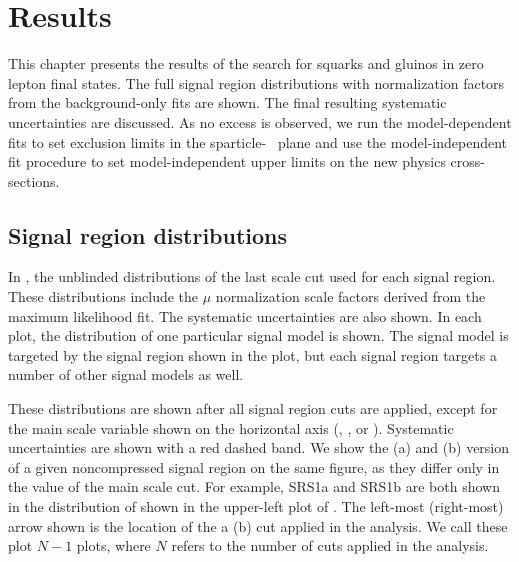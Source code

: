 

\chapter[Results][Results]{Results}

This chapter presents the results of the search for squarks and gluinos in zero lepton final states.
The full signal region distributions with normalization factors from the background-only fits are shown.
The final resulting systematic uncertainties are discussed.
As no excess is observed, we run the model-dependent fits to set exclusion limits in the sparticle-\lsp~ plane and use the model-independent fit procedure to set model-independent upper limits on the new physics cross-sections.

\section{Signal region distributions}


In ,  the unblinded distributions of the last scale cut used for each signal region.
These distributions include the $\mu$ normalization scale factors derived from the maximum likelihood fit.
The systematic uncertainties are also shown.
In each plot, the distribution of one particular signal model is shown.
The signal model is targeted by the signal region shown in the plot, but each signal region targets a number of other signal models as well.

These distributions are shown after all signal region cuts are applied, except for the main scale variable shown on the horizontal axis (\ptisr, , or ).
Systematic uncertainties are shown with a red dashed band.
We show the (a) and (b) version of a given noncompressed signal region on the same figure, as they differ only in the value of the main scale cut.
For example, SRS1a and SRS1b are both shown in the distribution of  shown in the upper-left plot of .
The left-most (right-most) arrow shown is the location of the a (b) cut applied in the analysis.
We call these plot \textit{$N-1$} plots, where $N$ refers to the number of cuts applied in the analysis.

